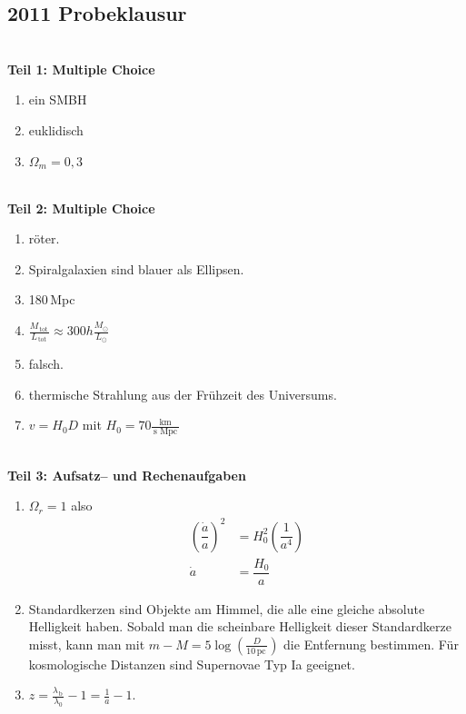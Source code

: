 \documentclass[a4paper,12pt]{article}
\numberwithin{equation}{section}
\begin{document}

\newpage


\subsection{2011 Probeklausur}
\hfill\\\textbf{Teil 1: Multiple Choice}
\begin{enumerate}[label=\arabic*.]
        \item ein SMBH
        \item euklidisch
        \item $\Omega _m=0,3$
\end{enumerate}
\hfill\\\textbf{Teil 2: Multiple Choice}
\begin{enumerate}[label=\arabic*.]
        \item röter.
        \item Spiralgalaxien sind blauer als Ellipsen.
        \item 180\,Mpc
        \item $\tfrac{M_{\,\text{tot}\,}}{L_{\,\text{tot}\,}}\approx 300h\tfrac{M_\odot}{L_\odot}$ 
        \item falsch.
        \item thermische Strahlung aus der Frühzeit des Universums.
        \item $v=H_0D$ mit $H_0 =70\tfrac{\,\text{km}\,}{\,\text{s}\,\,\text{Mpc}\,}$ 
\end{enumerate}
\hfill\\\textbf{Teil 3: Aufsatz-- und Rechenaufgaben}
\begin{enumerate}[label=\arabic*.]
        \item $\Omega _r=1$ also
                \begin{align*} 
                        \left(\dfrac{\dot{a}}{a}\right)^2&=H_0^2\left(\dfrac{1}{a^4}\right)\\
                        \dot{a}&=\dfrac{H_0}{a}
                \end{align*} 
        \item Standardkerzen sind Objekte am Himmel, die alle eine gleiche absolute Helligkeit haben. Sobald man die scheinbare Helligkeit dieser Standardkerze misst, kann man mit $m-M=5\log \left(\tfrac{D}{10\,\text{pc}\,}\right)$ die Entfernung bestimmen. Für kosmologische Distanzen sind Supernovae Typ Ia geeignet.
        \item $z=\tfrac{\lambda _{\,\text{b}\,}}{\lambda _0}-1=\tfrac{1}{a}-1$.
\end{enumerate}
\end{document}
